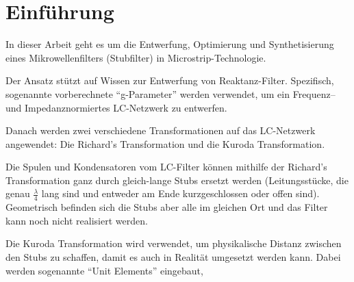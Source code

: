 \section{Einf\"uhrung}

In dieser  Arbeit  geht  es um die Entwerfung, Optimierung und Synthetisierung
eines Mikrowellenfilters (Stubfilter) in Microstrip-Technologie.

Der Ansatz st\"utzt auf Wissen zur Entwerfung von Reaktanz-Filter. Spezifisch,
sogenannte  vorberechnete  ``g-Parameter'' werden verwendet, um ein Frequenz--
und Impedanznormiertes LC-Netzwerk zu entwerfen.

Danach  werden  zwei  verschiedene  Transformationen   auf   das   LC-Netzwerk
angewendet: Die Richard's Transformation und die Kuroda Transformation.

Die Spulen und Kondensatoren vom  LC-Filter  k\"onnen  mithilfe  der Richard's
Transformation ganz durch gleich-lange Stubs ersetzt werden (Leitungsst\"ucke,
die  genau $\frac{\lambda}{4}$ lang sind und entweder am Ende  kurzgeschlossen
oder offen sind). Geometrisch befinden sich die  Stubs  aber  alle im gleichen
Ort und das Filter kann noch nicht realisiert werden.

Die Kuroda Transformation wird  verwendet,  um  physikalische Distanz zwischen
den  Stubs  zu  schaffen, damit es auch in Realit\"at umgesetzt  werden  kann.
Dabei  werden  sogenannte  ``Unit Elements''  eingebaut, 


